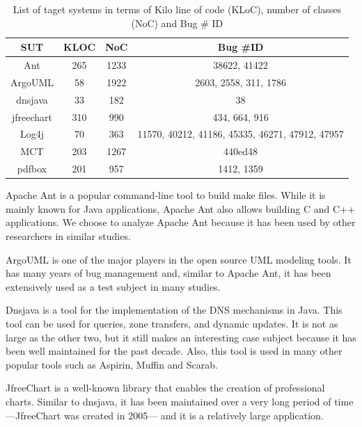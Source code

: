 \documentclass[times]{smrauth}
\begin{document}
\begin{table}[h!]
\centering
\begin{tabular}{c|c|c|c}
SUT        & KLOC & NoC  & Bug \#ID                                        \\ \hline \hline
Ant        & 265  & 1233 & 38622, 41422                                    \\
ArgoUML    & 58   & 1922 & 2603, 2558, 311, 1786                           \\
dnsjava    & 33   & 182  & 38                                              \\
jfreechart & 310  & 990  & 434, 664, 916                                   \\
Log4j      & 70   & 363  & 11570, 40212, 41186, 45335, 46271, 47912, 47957 \\
MCT        & 203  & 1267 & 440ed48                                         \\
pdfbox     & 201  & 957  & 1412, 1359 \\ \hline \hline
\end{tabular}
\caption{List of taget systems in terms of Kilo line of code (KLoC), number of classes (NoC) and Bug \# ID}
\label{tab:jacharming-systems}
\end{table}

Apache Ant \cite{ApacheSoftwareFoundation} is a popular command-line tool to build
make files. While it is mainly known for Java applications,
Apache Ant also allows building C and C++ applications. We
choose to analyze Apache Ant because it has been used by
other researchers in similar studies.

ArgoUML \cite{CollabNet} is one of the major players in the open source
UML modeling tools. It has many years of bug management
and, similar to Apache Ant, it has been extensively used as a
test subject in many studies.

Dnsjava \cite{Wellington2013} is a tool for the implementation of the DNS
mechanisms in Java. This tool can be used for queries, zone
transfers, and dynamic updates. It is not as large as the other
two, but it still makes an interesting case subject because it has
been well maintained for the past decade. Also, this tool is
used in many other popular tools such as Aspirin, Muffin and
Scarab.

JfreeChart \cite{ObjectRefineryLimited2005} is a well-known library that enables the
creation of professional charts. Similar to dnsjava, it has been
maintained over a very long period of time —JfreeChart was
created in 2005— and it is a relatively large application.
\end{document}
